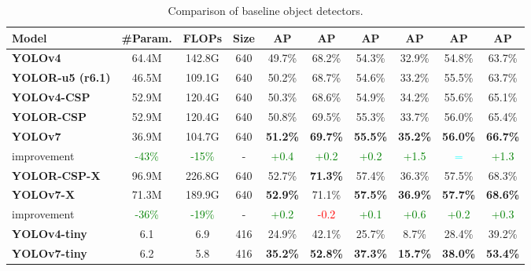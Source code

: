 \documentclass[10pt,twocolumn,letterpaper]{article}
\begin{document}
		\begin{table*}[t]
			\centering
			\begin{threeparttable}[t]
				\footnotesize
				\caption{Comparison of baseline object detectors.}
				\label{table:base}
\begin{tabular}{lccccccccc}
					\toprule
					\textbf{Model} & \textbf{\#Param.} & \textbf{FLOPs} & \textbf{Size} & \textbf{AP} & \textbf{AP} & \textbf{AP} & \textbf{AP} & \textbf{AP} & \textbf{AP} \\	
					\midrule
					\textbf{YOLOv4 \cite{bochkovskiy2020yolov4}} & 64.4M & 142.8G & 640 & 49.7\% & 68.2\% & 54.3\% & 32.9\% & 54.8\% & 63.7\% \\
					\textbf{YOLOR-u5 (r6.1) \cite{wang2021you}} & 46.5M & 109.1G & 640 & 50.2\% & 68.7\% & 54.6\% & 33.2\% & 55.5\% & 63.7\% \\
					\textbf{YOLOv4-CSP \cite{wang2021scaled}} & 52.9M & 120.4G & 640 & 50.3\% & 68.6\% & 54.9\% & 34.2\% & 55.6\% & 65.1\% \\
					\textbf{YOLOR-CSP \cite{wang2021you}} & 52.9M & 120.4G & 640 & 50.8\% & 69.5\% & 55.3\% & 33.7\% & 56.0\% & 65.4\% \\
					\textbf{YOLOv7} & 36.9M & 104.7G & 640 & \textbf{51.2\%} & \textbf{69.7\%} & \textbf{55.5\%} & \textbf{35.2\%} & \textbf{56.0\%} & \textbf{66.7\%} \\
					improvement & \textcolor{green}{-43\%} & \textcolor{green}{-15\%} & - & \textcolor{green}{+0.4} & \textcolor{green}{+0.2} & \textcolor{green}{+0.2} & \textcolor{green}{+1.5} & \textcolor{cyan}{=} & \textcolor{green}{+1.3} \\
					\midrule
					\textbf{YOLOR-CSP-X \cite{wang2021you}} & 96.9M & 226.8G & 640 & 52.7\% & \textbf{71.3\%} & 57.4\% & 36.3\% & 57.5\% & 68.3\% \\
					\textbf{YOLOv7-X} & 71.3M & 189.9G & 640 & \textbf{52.9\%} & 71.1\% & \textbf{57.5\%} & \textbf{36.9\%} & \textbf{57.7\%} & \textbf{68.6\%} \\
					improvement & \textcolor{green}{-36\%} & \textcolor{green}{-19\%} & - & \textcolor{green}{+0.2} & \textcolor{red}{-0.2} & \textcolor{green}{+0.1} & \textcolor{green}{+0.6} & \textcolor{green}{+0.2} & \textcolor{green}{+0.3} \\
					\midrule
					\textbf{YOLOv4-tiny \cite{wang2021scaled}} & 6.1 & 6.9 & 416 & 24.9\% & 42.1\% & 25.7\% & 8.7\% & 28.4\% & 39.2\% \\
\textbf{YOLOv7-tiny} & 6.2 & 5.8 & 416 & \textbf{35.2\%} & \textbf{52.8\%} & \textbf{37.3\%} & \textbf{15.7\%} & \textbf{38.0\%} & \textbf{53.4\%} \\

\end{tabular}
\end{threeparttable}
\end{table*}
\end{document}
